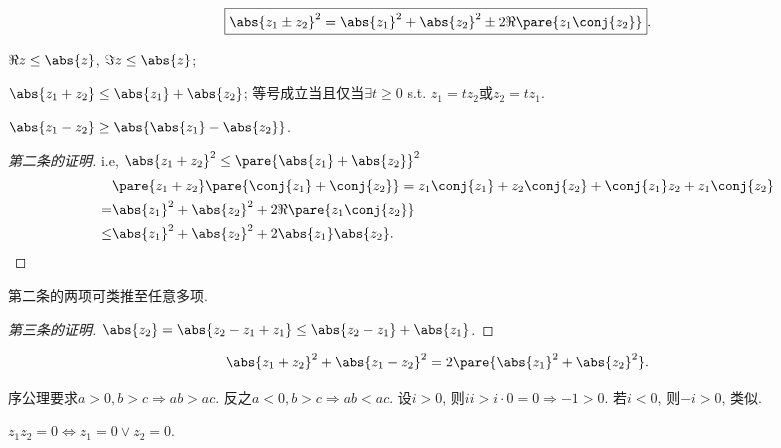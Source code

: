\documentclass{ctexart}
\begin{document}
\begin{equation}
    \label{eq:复数平方和展开}
    \boxed{\abs{z_1\pm z_2}^2 = \abs{z_1}^2 + \abs{z_2}^2 \pm 2\Re\pare{z_1\conj{z_2}}}.
\end{equation}
\begin{proposition}[模的不等式]\leavevmode
    \label{prop:模的不等式}
    \begin{cenum}
        \item $\Re z \le \abs{z}$, $\Im z \le \abs{z}$;
        \item $\abs{z_1+z_2} \le \abs{z_1} + \abs{z_2}$; 等号成立当且仅当$\exists t\ge 0$ s.t. $z_1 = tz_2$或$z_2 = tz_1$.
        \item $\abs{z_1-z_2} \ge \abs{\abs{z_1} - \abs{z_2}}$.
    \end{cenum}
\end{proposition}
\begin{proof}[第二条的证明]
    i.e, $\abs{z_1+z_2}^2 \le \pare{\abs{z_1}+\abs{z_2}}^2$
    \begin{align*}
         &\pare{z_1+z_2}\pare{\conj{z_1}+\conj{z_2}} = z_1\conj{z_1} + z_2\conj{z_2} + \conj{z_1}z_2 + z_1\conj{z_2}\\
          =& \abs{z_1}^2 + \abs{z_2}^2 + 2\Re\pare{z_1\conj{z_2}} \\
          \le& \abs{z_1}^2 + \abs{z_2}^2 + 2\abs{z_1}\abs{z_2}. \qedhere
    \end{align*}
\end{proof}
\begin{remark}
    第二条的两项可类推至任意多项.
\end{remark}
\begin{proof}[第三条的证明]
    $\abs{z_2} = \abs{z_2-z_1+z_1} \le \abs{z_2-z_1} + \abs{z_1}$.
\end{proof}
\begin{corollary}
    \begin{equation}
        \label{eq:平行四边形恒等式}
        \abs{z_1+z_2}^2 + \abs{z_1-z_2}^2 = 2\pare{\abs{z_1}^2 + \abs{z_2}^2}. 
    \end{equation}
\end{corollary}
\begin{sample}
    \begin{ex}[$\+bC$上无法定义全序]
        序公理要求$a>0, b>c \Rightarrow ab>ac$. 反之$a<0, b>c\Rightarrow ab<ac$. 设$i>0$, 则$ii > i\cdot 0 = 0 \Rightarrow -1 > 0$. 若$i<0$, 则$-i>0$, 类似.
    \end{ex}
\end{sample}
\begin{sample}
    \begin{ex}
        $z_1z_2 = 0\Leftrightarrow z_1=0\lor z_2 = 0$.
    \end{ex}
\end{sample}
\end{document}
